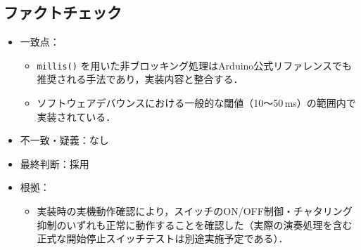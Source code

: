 \documentclass[lualatex,paper=a4paper,jafontsize=11.5pt,jafontscale=1.05]{jlreq}
\begin{document}
\subsection{ファクトチェック}
\begin{itemize}
  \item 一致点：
  \begin{itemize}
    \item \texttt{millis()} を用いた非ブロッキング処理はArduino公式リファレンス\cite{millis}でも推奨される手法であり，実装内容と整合する．
    \item ソフトウェアデバウンスにおける一般的な閾値（10〜50\,ms）の範囲内で実装されている．
  \end{itemize}
  \item 不一致・疑義：なし
  \item 最終判断：採用
  \item 根拠：
  \begin{itemize}
    \item 実装時の実機動作確認により，スイッチのON/OFF制御・チャタリング抑制のいずれも正常に動作することを確認した（実際の演奏処理を含む正式な開始停止スイッチテストは別途実施予定である）．
  \end{itemize}
\end{itemize}
\end{document}
